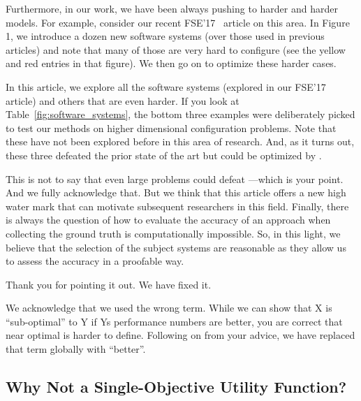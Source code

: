 Furthermore, in our work, we have been always pushing to harder and harder models. For example, consider our recent FSE'17~\cite{nair2017using} article on this area. In Figure 1, we introduce a dozen new software systems (over those used in previous articles) and note that many of those are very hard to configure (see the yellow and red entries in that figure).  We then go on to optimize these harder cases.

In this article, we explore all the software systems (explored in our FSE'17 article) and others that are even harder. If you look at Table~\ref{fig:software_systems}, the bottom three examples were deliberately picked to test our methods on higher dimensional configuration problems.  Note that these have not been explored before in this area of research. And, as it turns out, these three defeated the prior state of the art but could be optimized by \flash.

This is not to say that even large problems could defeat \flash---which is your point. And we fully acknowledge that. But we think that this article offers a new high water mark that can motivate subsequent researchers in this field. Finally, there is always the question of how to evaluate the accuracy of an approach when collecting the ground truth is computationally impossible. So, in this light, we believe that the selection of the subject systems are reasonable as they allow us to assess the accuracy in a proofable way.


Thank you for pointing it out. We have fixed it.


We acknowledge that we used the wrong term. While we can show that X is “sub-optimal” to Y if Y\textquotesingle s performance numbers are better, you are correct that near optimal is harder to define.  Following on from your advice, we have replaced that term globally with ``better''.

\subsection*{Why Not a Single-Objective Utility Function?}

